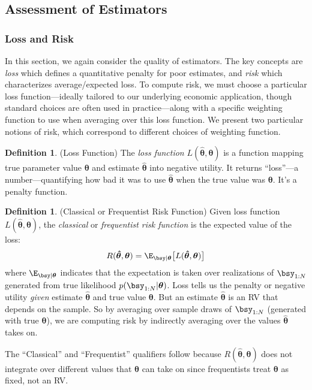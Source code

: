 \documentclass[12pt]{article}
\theoremstyle{plain}
\theoremstyle{definition}
\newtheorem{defn}[thm]{Definition}
\theoremstyle{remark}
\newcommand{\bstheta}{\boldsymbol{\theta}}
\newcommand{\bshattheta}{\boldsymbol{\hat{\theta}}}
\begin{document}
\clearpage
\subsection{Assessment of Estimators}

\subsubsection{Loss and Risk}

In this section, we again consider the quality of estimators. The key
concepts are \emph{loss} which defines a quantitative penalty for poor
estimates, and \emph{risk} which characterizes average/expected loss.
To compute risk, we must choose a particular loss function---ideally
tailored to our underlying economic application, though standard choices
are often used in practice---along with a specific weighting function to
use when averaging over this loss function. We present two particular
notions of risk, which correspond to different choices of weighting
function.

\begin{defn}(Loss Function)
The \emph{loss function} $L(\bshattheta,\bstheta)$ is a function mapping
true parameter value $\bstheta$ and estimate $\bshattheta$ into negative
utility. It returns ``loss''---a number---quantifying how bad it was to
use $\bshattheta$ when the true value was $\bstheta$. It's a penalty
function.
\end{defn}

\begin{defn}{(Classical or Frequentist Risk Function)}
Given loss function $L(\bshattheta,\bstheta)$, the \emph{classical} or
\emph{frequentist risk function} is the expected value of the loss:
\begin{align*}
  R(\bshattheta,\bstheta)
  = \E_{\bsy|\bstheta}\big[L(\bshattheta,\bstheta)\big]
\end{align*}
where $\E_{\bsy|\bstheta}$ indicates that the expectation is taken over
realizations of $\bsy_{1:N}$ generated from true likelihood
$p(\bsy_{1:N}|\bstheta)$.
Loss tells us the penalty or negative utility \emph{given} estimate
$\bshattheta$ and true value $\bstheta$. But an estimate $\bshattheta$
is an RV that depends on the sample.
So by averaging over sample draws of $\bsy_{1:N}$ (generated with true
$\bstheta$), we are computing risk by indirectly averaging over the
values $\bshattheta$ takes on.

The ``Classical'' and ``Frequentist'' qualifiers follow because
$R(\bshattheta,\bstheta)$ does not integrate over different values that
$\bstheta$ can take on since frequentists treat $\bstheta$ as fixed, not
an RV.
\end{defn}
\end{document}
